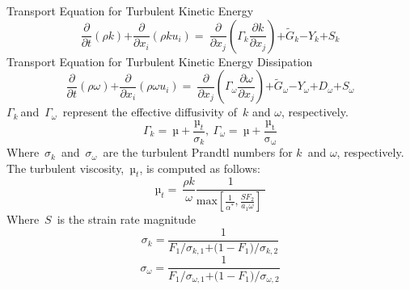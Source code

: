\documentclass[Afour,sagev,times]{sagej}
\begin{document}
\noindent Transport Equation for Turbulent Kinetic Energy
\begin{equation} \label{GrindEQ__2_} 
\frac{\partial }{\partial t}\left(\rho k\right)\mathrm{+}\frac{\partial }{\partial x_i}\left(\rho ku_i\right)\mathrm{=\ }\frac{\partial }{\partial x_j}\left({\mathit{\Gamma}}_k\frac{\partial k}{\partial x_j}\right)\mathrm{+}{\tilde{G}}_k\mathrm{-}Y_k\mathrm{+}S_k 
\end{equation} 
Transport Equation for Turbulent Kinetic Energy Dissipation\textbf{    }
\begin{equation} \label{GrindEQ__3_} 
\frac{\partial }{\partial t}\left(\rho \omega \right)\mathrm{+}\frac{\partial }{\partial x_i}\left(\rho \omega u_i\right)\mathrm{=\ }\frac{\partial }{\partial x_j}\left({\mathit{\Gamma}}_{\omega }\frac{\partial \omega }{\partial x_j}\right)\mathrm{+}{\tilde{G}}_{\omega }\mathrm{-}Y_{\omega }\mathrm{+}D_{\omega }\mathrm{+}S_{\omega } 
\end{equation} 
${\mathit{\Gamma}}_k\ $and~${\mathit{\Gamma}}_{\omega }$~represent the effective diffusivity of~$k$ and $\omega $, respectively.
\begin{equation} \label{GrindEQ__4_} 
{\mathit{\Gamma}}_k\mathrm{=\ \textrm{µ}+}\frac{{\mathrm{\textrm{µ}}}_t}{{\sigma }_k}\mathrm{,\ }{\mathit{\Gamma}}_{\omega }\mathrm{=\ \textrm{µ}+}\frac{{\mathrm{\textrm{µ}}}_{\mathrm{t}}}{{\mathrm{\sigma }}_{\mathrm{\omega}}} 
\end{equation} 
Where~${\sigma }_k$~and~${\sigma }_{\omega }$~are the turbulent Prandtl numbers for $k$~and $\omega $, respectively. The turbulent viscosity,~${\textrm{µ}}_t$, is computed as follows:
\begin{equation} \label{GrindEQ__5_} 
{\mathrm{\textrm{µ}}}_t\mathrm{=\ }\frac{\rho k}{\omega }\frac{\mathrm{1}}{{\mathrm{max} \left[\frac{\mathrm{1}}{{\alpha }^{\mathrm{*}}},\frac{SF_{\mathrm{2}}}{a_{\mathrm{1}}\omega }\right]\ }} 
\end{equation} 
Where~$S$~is the strain rate magnitude 
\begin{equation} \label{GrindEQ__6_} 
{\sigma }_k\mathrm{=}\frac{\mathrm{1}}{{F_{\mathrm{1}}}/{{\sigma }_{k\mathrm{,1}}\mathrm{+(1-}F_{\mathrm{1}}\mathrm{)/}{\sigma }_{k\mathrm{,2}}}} 
\end{equation} 
\begin{equation} \label{GrindEQ__7_} 
{\sigma }_{\omega }\mathrm{=}\frac{\mathrm{1}}{{F_{\mathrm{1}}}/{{\sigma }_{\omega \mathrm{,1}}\mathrm{+(1-}F_{\mathrm{1}}\mathrm{)/}{\sigma }_{\omega \mathrm{,2}}}} 
\end{equation} 
\end{document}

